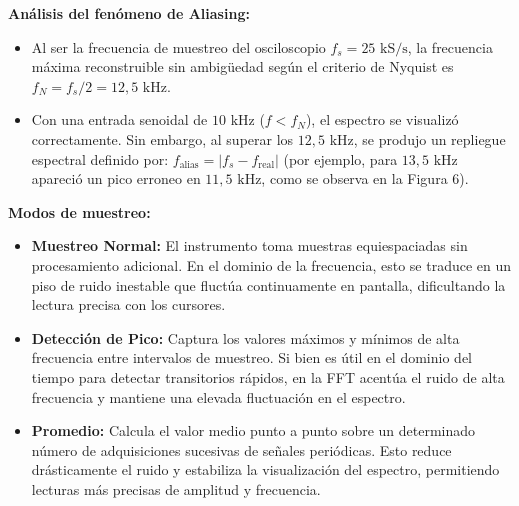 \begin{centering}
\textbf{Análisis del fenómeno de Aliasing:}
\begin{itemize}
    \item Al ser la frecuencia de muestreo del osciloscopio $f_s = 25\text{ kS/s}$, la frecuencia máxima reconstruible sin ambigüedad según el criterio de Nyquist es $f_N = f_s / 2 = 12,5\text{ kHz}$. 

    \item Con una entrada senoidal de $10\text{ kHz}$ ($f < f_N$), el espectro se visualizó correctamente. Sin embargo, al superar los $12,5\text{ kHz}$, se produjo un repliegue espectral definido por: $f_{\text{alias}} = |f_s - f_{\text{real}}|$ (por ejemplo, para $13,5\text{ kHz}$ apareció un pico erroneo en $11,5\text{ kHz}$, como se observa en la Figura 6).
\end{itemize}
\end{centering}

\vspace{2cm}
\begin{centering}
\textbf{Modos de muestreo:}
\begin{itemize}
    \item \textbf{Muestreo Normal:} El instrumento toma muestras equiespaciadas sin procesamiento adicional. En el dominio de la frecuencia, esto se traduce en un piso de ruido inestable que fluctúa continuamente en pantalla, dificultando la lectura precisa con los cursores.
    \item \textbf{Detección de Pico:} Captura los valores máximos y mínimos de alta frecuencia entre intervalos de muestreo. Si bien es útil en el dominio del tiempo para detectar transitorios rápidos, en la FFT acentúa el ruido de alta frecuencia y mantiene una elevada fluctuación en el espectro.
    \item \textbf{Promedio:} Calcula el valor medio punto a punto sobre un determinado número de adquisiciones sucesivas de señales periódicas. Esto reduce drásticamente el ruido y estabiliza la visualización del espectro, permitiendo lecturas más precisas de amplitud y frecuencia.
\end{itemize}
\end{centering}
